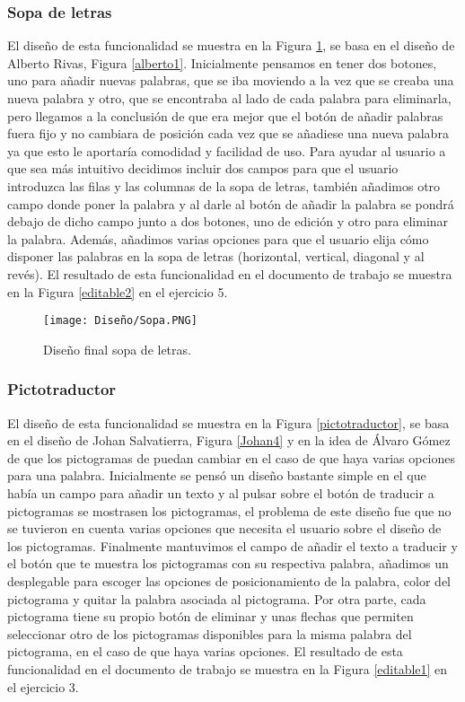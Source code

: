 \subsubsection{Sopa de letras}
El diseño de esta funcionalidad se muestra en la Figura \ref{sopaLetras}, se basa en el diseño de Alberto Rivas, Figura \ref{alberto1}. Inicialmente pensamos en tener dos botones, uno para añadir nuevas palabras, que se iba moviendo a la vez que se creaba una nueva palabra y otro, que se encontraba al lado de cada palabra para eliminarla, pero llegamos a la conclusión
de que era mejor que el botón de añadir palabras fuera fijo y no cambiara de posición cada vez que se añadiese una nueva palabra ya que esto le aportaría comodidad y facilidad de uso. Para ayudar al usuario a que sea más intuitivo decidimos incluir dos campos para que el usuario introduzca las filas y las columnas de la sopa de letras, también añadimos otro campo donde poner la palabra y al darle al botón de añadir la palabra se pondrá debajo de dicho campo junto a dos botones, uno de edición y otro para eliminar la palabra. Además, añadimos varias opciones para que el usuario elija cómo disponer las palabras en la sopa de letras (horizontal, vertical, diagonal y al revés). El resultado de esta funcionalidad en el documento de trabajo se muestra en la Figura \ref{editable2} en el ejercicio 5.

\begin{figure}[ht!]
  \centering
  \texttt{[image: Diseño/Sopa.PNG]}
  \caption{Diseño final sopa de letras.}
  \label{sopaLetras}
\end{figure}

\subsubsection{Pictotraductor}
El diseño de esta funcionalidad se muestra en la Figura \ref{pictotraductor}, se basa en el diseño de Johan Salvatierra, Figura \ref{Johan4} y en la idea de Álvaro Gómez de que los pictogramas de puedan cambiar en el caso de que haya varias opciones para una palabra. Inicialmente se pensó un diseño bastante simple en el que había un campo para añadir un texto y al pulsar sobre el botón de traducir a pictogramas se mostrasen los pictogramas, el problema de este diseño fue que no se tuvieron en cuenta varias opciones que necesita el usuario sobre el diseño de los pictogramas. Finalmente mantuvimos el campo de añadir el texto a traducir y el botón que te muestra los pictogramas con su respectiva palabra, añadimos un desplegable para escoger las opciones de posicionamiento de la palabra, color del pictograma y quitar la palabra asociada al pictograma. Por otra parte, cada pictograma tiene su propio botón de eliminar y unas flechas que permiten seleccionar otro de los pictogramas disponibles para la misma palabra del pictograma, en el caso de que haya varias opciones. El resultado de esta funcionalidad en el documento de trabajo se muestra en la Figura \ref{editable1} en el ejercicio 3.



